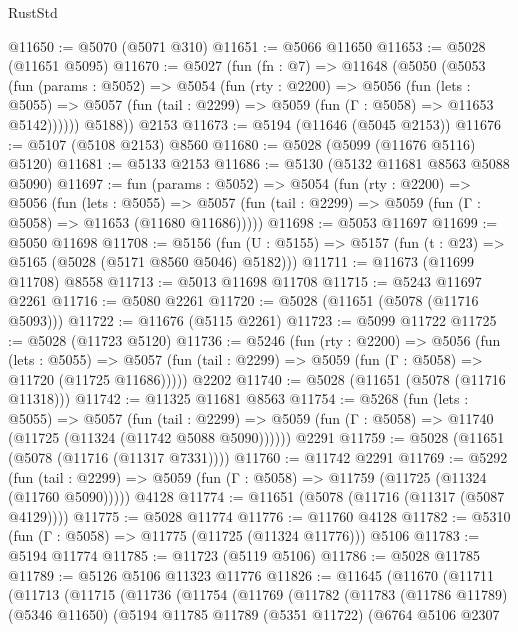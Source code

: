 \begin{lexlean}{RustStd}
\begin{coremodule}
{\begin{coremodule}
{{{{{{{{{{{{@11650 := @5070 (@5071 @310)
@11651 := @5066 @11650
@11653 := @5028 (@11651 @5095)
@11670 := @5027
    (fun (fn : @7) =>
    @11648
      (@5050
        (@5053
          (fun (params : @5052) =>
          @5054
            (fun (rty : @2200) =>
            @5056
              (fun (lets : @5055) =>
              @5057 (fun (tail : @2299) => @5059 (fun (Γ : @5058) => @11653 @5142))))))
        @5188))
    @2153
@11673 := @5194 (@11646 (@5045 @2153))
@11676 := @5107 (@5108 @2153) @8560
@11680 := @5028 (@5099 (@11676 @5116) @5120)
@11681 := @5133 @2153
@11686 := @5130 (@5132 @11681 @8563 @5088 @5090)
@11697 := fun (params : @5052) =>
  @5054
    (fun (rty : @2200) =>
    @5056
      (fun (lets : @5055) =>
      @5057 (fun (tail : @2299) => @5059 (fun (Γ : @5058) => @11653 (@11680 @11686)))))
@11698 := @5053 @11697
@11699 := @5050 @11698
@11708 := @5156
    (fun (U : @5155) => @5157 (fun (t : @23) => @5165 (@5028 (@5171 @8560 @5046) @5182)))
@11711 := @11673 (@11699 @11708) @8558
@11713 := @5013 @11698 @11708
@11715 := @5243 @11697 @2261
@11716 := @5080 @2261
@11720 := @5028 (@11651 (@5078 (@11716 @5093)))
@11722 := @11676 (@5115 @2261)
@11723 := @5099 @11722
@11725 := @5028 (@11723 @5120)
@11736 := @5246
    (fun (rty : @2200) =>
    @5056
      (fun (lets : @5055) =>
      @5057 (fun (tail : @2299) => @5059 (fun (Γ : @5058) => @11720 (@11725 @11686)))))
    @2202
@11740 := @5028 (@11651 (@5078 (@11716 @11318)))
@11742 := @11325 @11681 @8563
@11754 := @5268
    (fun (lets : @5055) =>
    @5057
      (fun (tail : @2299) =>
      @5059 (fun (Γ : @5058) => @11740 (@11725 (@11324 (@11742 @5088 @5090))))))
    @2291
@11759 := @5028 (@11651 (@5078 (@11716 (@11317 @7331))))
@11760 := @11742 @2291
@11769 := @5292
    (fun (tail : @2299) => @5059 (fun (Γ : @5058) => @11759 (@11725 (@11324 (@11760 @5090)))))
    @4128
@11774 := @11651 (@5078 (@11716 (@11317 (@5087 @4129))))
@11775 := @5028 @11774
@11776 := @11760 @4128
@11782 := @5310 (fun (Γ : @5058) => @11775 (@11725 (@11324 @11776))) @5106
@11783 := @5194 @11774
@11785 := @11723 (@5119 @5106)
@11786 := @5028 @11785
@11789 := @5126 @5106 @11323 @11776
@11826 := @11645
    (@11670
      (@11711
        (@11713
          (@11715
            (@11736
              (@11754
                (@11769
                  (@11782
                    (@11783
                      (@11786 @11789)
                      (@5346 @11650)
                      (@5194
                        @11785
                        @11789
                        (@5351 @11722)
                        (@6764
                          @5106
                          @2307
}}}}}}}}}}}}
\end{coremodule}}
\end{coremodule}
\end{lexlean}
